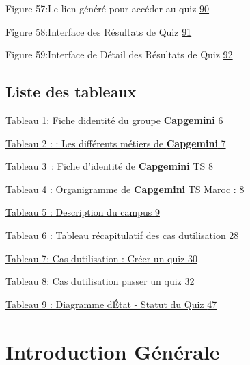 \documentclass[12pt,a4paper,twoside]{report}
\begin{document}
Figure 57:Le lien généré pour accéder au quiz
\protect\hyperlink{_Toc203823467}{90}

Figure 58:Interface des Résultats de Quiz
\protect\hyperlink{_Toc203823468}{91}

Figure 59:Interface de Détail des Résultats de Quiz
\protect\hyperlink{_Toc203823469}{92}

\hypertarget{liste-des-tableaux}{%
\section{Liste des tableaux}\label{liste-des-tableaux}}

\protect\hyperlink{_Toc203823475}{Tableau 1: Fiche
d\textquotesingle identité du groupe \textbf{Capgemini}
\protect\hyperlink{_Toc203823475}{6}}

\protect\hyperlink{_Toc203823476}{Tableau 2 : : Les différents métiers
de \textbf{Capgemini} \protect\hyperlink{_Toc203823476}{7}}

\protect\hyperlink{_Toc203823477}{Tableau 3~: Fiche d'identité de
\textbf{Capgemini} TS \protect\hyperlink{_Toc203823477}{8}}

\protect\hyperlink{_Toc203823478}{Tableau 4 : Organigramme de
\textbf{Capgemini} TS Maroc : \protect\hyperlink{_Toc203823478}{8}}

\protect\hyperlink{_Toc203823479}{Tableau 5 : Description du campus
\protect\hyperlink{_Toc203823479}{9}}

\protect\hyperlink{_Toc203823480}{Tableau 6 : Tableau récapitulatif des
cas d\textquotesingle utilisation \protect\hyperlink{_Toc203823480}{28}}

\protect\hyperlink{_Toc203823481}{Tableau 7: Cas
d\textquotesingle utilisation : Créer un quiz
\protect\hyperlink{_Toc203823481}{30}}

\protect\hyperlink{_Toc203823482}{Tableau 8: Cas
d\textquotesingle utilisation passer un quiz
\protect\hyperlink{_Toc203823482}{32}}

\protect\hyperlink{_Toc203823483}{Tableau 9 : Diagramme
d\textquotesingle État - Statut du Quiz
\protect\hyperlink{_Toc203823483}{47}}

\newpage
{}
\setcounter{page}{1}

\chapter{Introduction Générale}
\end{document}
